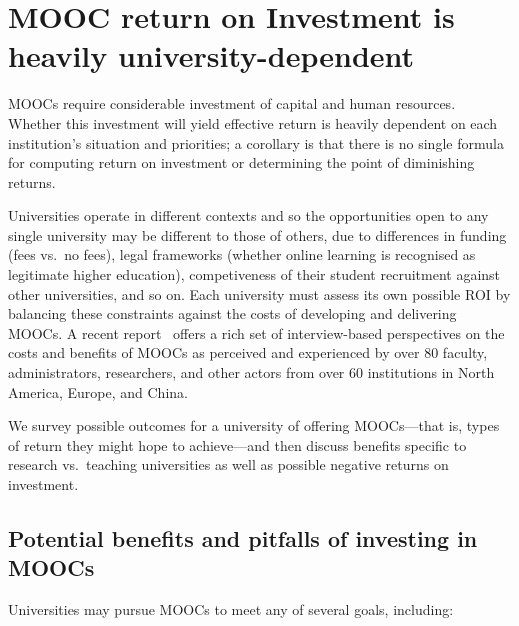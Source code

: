 \section{MOOC return on Investment is heavily university-dependent}
\label{sec:roi}


MOOCs require considerable investment of capital and human resources.
Whether this investment will yield effective return is heavily dependent
on each institution's situation and priorities; a corollary is that
there is no single formula for computing return on investment or
determining the point of diminishing returns.

Universities operate in different contexts and so the opportunities open
to any single university may be different to those of others, due to
differences in funding (fees vs.\ no fees), legal frameworks (whether online
learning is recognised as legitimate higher education), competiveness of their
student recruitment against other universities, and so on.  Each
university must assess its own possible ROI by balancing these constraints
against the costs of developing and delivering MOOCs.
A recent report~\cite{moocs-expectations-and-reality} offers a rich set of
interview-based perspectives on the costs and benefits of MOOCs as
perceived and experienced by over 80 faculty, administrators,
researchers, and other actors from over 60 institutions in North
America, Europe, and China.

We survey possible outcomes for a university of offering MOOCs---that
is, types of return they might hope to achieve---and then discuss
benefits specific to research vs.\ teaching universities as well as
possible negative returns on investment.

\subsection{Potential benefits and pitfalls of investing in MOOCs}
 
Universities may pursue MOOCs to meet any of several goals, including:

